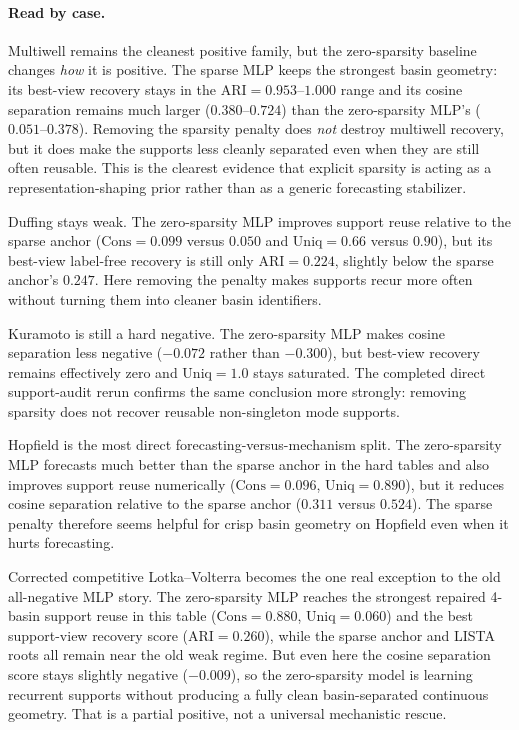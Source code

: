 \paragraph{Read by case.}
Multiwell remains the cleanest positive family, but the zero-sparsity baseline
changes \emph{how} it is positive. The sparse MLP keeps the strongest basin
geometry: its best-view recovery stays in the $\mathrm{ARI}=0.953$--$1.000$
range and its cosine separation remains much larger
($0.380$--$0.724$) than the zero-sparsity MLP's
($0.051$--$0.378$). Removing the sparsity penalty does \emph{not} destroy
multiwell recovery, but it does make the supports less cleanly separated even
when they are still often reusable. This is the clearest evidence that explicit
sparsity is acting as a representation-shaping prior rather than as a generic
forecasting stabilizer.

Duffing stays weak. The zero-sparsity MLP improves support reuse relative to
the sparse anchor ($\mathrm{Cons}=0.099$ versus $0.050$ and
$\mathrm{Uniq}=0.66$ versus $0.90$), but its best-view label-free recovery is
still only $\mathrm{ARI}=0.224$, slightly below the sparse anchor's
$0.247$. Here removing the penalty makes supports recur more often without
turning them into cleaner basin identifiers.

Kuramoto is still a hard negative. The zero-sparsity MLP makes cosine
separation less negative ($-0.072$ rather than $-0.300$), but best-view
recovery remains effectively zero and $\mathrm{Uniq}=1.0$ stays saturated. The
completed direct support-audit rerun confirms the same conclusion more
strongly: removing sparsity does not recover reusable non-singleton mode
supports.

Hopfield is the most direct forecasting-versus-mechanism split. The
zero-sparsity MLP forecasts much better than the sparse anchor in the hard
tables and also improves support reuse numerically
($\mathrm{Cons}=0.096$, $\mathrm{Uniq}=0.890$), but it reduces cosine
separation relative to the sparse anchor ($0.311$ versus $0.524$). The sparse
penalty therefore seems helpful for crisp basin geometry on Hopfield even when
it hurts forecasting.

Corrected competitive Lotka--Volterra becomes the one real exception to the old
all-negative MLP story. The zero-sparsity MLP reaches the strongest repaired
4-basin support reuse in this table
($\mathrm{Cons}=0.880$, $\mathrm{Uniq}=0.060$) and the best support-view
recovery score ($\mathrm{ARI}=0.260$), while the sparse anchor and LISTA roots
all remain near the old weak regime. But even here the cosine separation score
stays slightly negative ($-0.009$), so the zero-sparsity model is learning
recurrent supports without producing a fully clean basin-separated continuous
geometry. That is a partial positive, not a universal mechanistic rescue.

